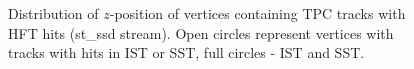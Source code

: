 \begin{figure}
\begin{minipage}{.4725\textwidth}
  \caption[Distribution of $z$-position of vertices with TPC tracks containing hits in HFT.]
   {Distribution of $z$-position of vertices containing TPC tracks with HFT hits (st\_ssd stream). Open circles represent vertices with tracks with hits in IST or SST, full circles - IST and SST.}
   \label{fig:zVtxHFT}%
\end{minipage}%
\end{figure}%











